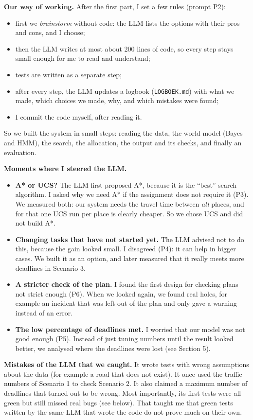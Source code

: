 \documentclass[11pt,a4paper]{article}
\begin{document}
\textbf{Our way of working.} After the first part, I set a few rules (prompt P2):
\begin{itemize}
  \item first we \emph{brainstorm} without code: the LLM lists the options with
    their pros and cons, and I choose;
  \item then the LLM writes at most about 200 lines of code, so every step stays
    small enough for me to read and understand;
  \item tests are written as a separate step;
  \item after every step, the LLM updates a logbook (\texttt{LOGBOEK.md}) with what
    we made, which choices we made, why, and which mistakes were found;
  \item I commit the code myself, after reading it.
\end{itemize}
So we built the system in small steps: reading the data, the world model
(Bayes and HMM), the search, the allocation, the output and its checks, and
finally an evaluation.

\textbf{Moments where I steered the LLM.}
\begin{itemize}
  \item \textbf{A* or UCS?} The LLM first proposed A*, because it is the ``best''
    search algorithm. I asked why we need A* if the assignment does not require
    it (P3). We measured both: our system needs the travel time between
    \emph{all} places, and for that one UCS run per place is clearly cheaper. So
    we chose UCS and did not build A*.
  \item \textbf{Changing tasks that have not started yet.} The LLM advised not to
    do this, because the gain looked small. I disagreed (P4): it can help in
    bigger cases. We built it as an option, and later measured that it really
    meets more deadlines in Scenario 3.
  \item \textbf{A stricter check of the plan.} I found the first design for
    checking plans not strict enough (P6). When we looked again, we found real
    holes, for example an incident that was left out of the plan and only gave
    a warning instead of an error.
  \item \textbf{The low percentage of deadlines met.} I worried that our model was
    not good enough (P5). Instead of just tuning numbers until the result looked
    better, we analysed where the deadlines were lost (see Section 5).
\end{itemize}

\textbf{Mistakes of the LLM that we caught.} It wrote tests with wrong
assumptions about the data (for example a road that does not exist). It once
used the traffic numbers of Scenario 1 to check Scenario 2. It also claimed a
maximum number of deadlines that turned out to be wrong. Most importantly, its
first tests were all green but still missed real bugs (see below). That taught
me that green tests written by the same LLM that wrote the code do not prove
much on their own.
\end{document}
